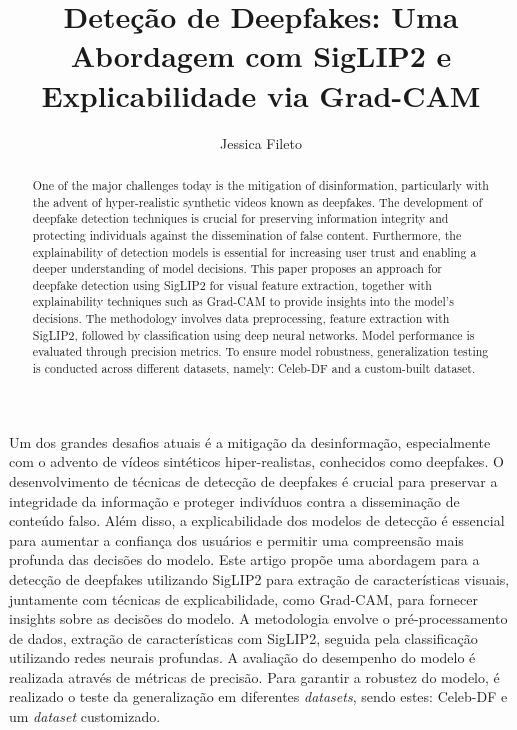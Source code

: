 \documentclass[12pt]{article}
\title{Deteção de Deepfakes: Uma Abordagem com SigLIP2 e Explicabilidade via Grad-CAM}
\author{Jessica Fileto\inst{1}}
\begin{document}
\maketitle
     
\begin{resumo} 
Um dos grandes desafios atuais é a mitigação da desinformação, especialmente com o
advento de vídeos sintéticos hiper-realistas, conhecidos como deepfakes.
O desenvolvimento de técnicas de detecção de deepfakes é crucial para preservar a integridade da informação
e proteger indivíduos contra a disseminação de conteúdo falso.
Além disso, a explicabilidade dos modelos de detecção é essencial para aumentar a confiança dos usuários
e permitir uma compreensão mais profunda das decisões do modelo.
Este artigo propõe uma abordagem para a detecção de deepfakes utilizando SigLIP2
para extração de características visuais, juntamente com técnicas de explicabilidade,
como Grad-CAM, para fornecer insights sobre as decisões do modelo. A metodologia envolve o pré-processamento de dados,
extração de características com SigLIP2, seguida pela classificação utilizando redes neurais profundas.
A avaliação do desempenho do modelo é realizada através de métricas de precisão.
Para garantir a robustez do modelo, é realizado o teste da generalização em diferentes \textit{datasets},
sendo estes: Celeb-DF e um \textit{dataset} customizado.
\end{resumo}

\begin{abstract}
One of the major challenges today is the mitigation of disinformation,
particularly with the advent of hyper-realistic synthetic videos known as deepfakes.
The development of deepfake detection techniques is crucial for preserving information
integrity and protecting individuals against the dissemination of false content.
Furthermore, the explainability of detection models is essential for increasing user trust and enabling a deeper understanding of model decisions.
This paper proposes an approach for deepfake detection using SigLIP2 for visual feature extraction,
together with explainability techniques such as Grad-CAM to provide insights into the model's decisions.
The methodology involves data preprocessing, feature extraction with SigLIP2, followed by classification using deep neural networks.
Model performance is evaluated through precision metrics.
To ensure model robustness, generalization testing is conducted across different datasets,
namely: Celeb-DF and a custom-built dataset.
\end{abstract}
\end{document}
